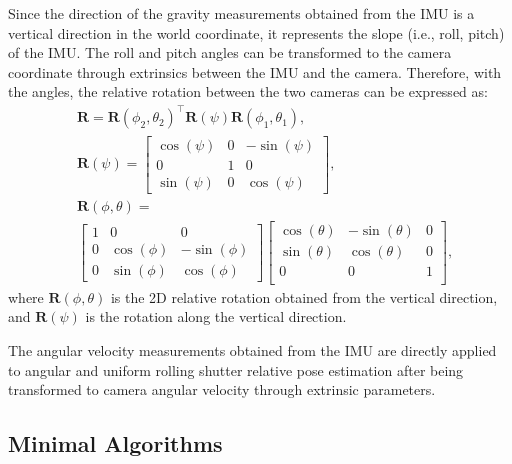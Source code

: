 \documentclass[10pt,twocolumn,letterpaper]{article}
\theoremstyle{definition}
\begin{document}
	Since the direction of the gravity measurements obtained from the IMU is a vertical direction in the world coordinate, it represents the slope (i.e., roll, pitch) of the IMU.
	The roll and pitch angles can be transformed to the camera coordinate through extrinsics between the IMU and the camera.
	Therefore, with the angles, the relative rotation between the two cameras can be expressed as:
	{
		\small
		\begin{equation}
		\begin{split}
		&\mathbf{R}  = 
		\mathbf{R}(\phi_2,\theta_2)^{\top} 
		\mathbf{R}(\psi)
		\mathbf{R}(\phi_1,\theta_1),
		\\
		& \mathbf{R}(\psi)
		=
		\begin{bmatrix}
		\cos\left(\psi\right) & 0 & -\sin\left(\psi\right) \\
		0 & 1 & 0 \\  
		\sin\left(\psi\right) & 0 & \cos\left(\psi\right)  
		\end{bmatrix},
		\\
		& \mathbf{R}(\phi,\theta) = \\
		&
		\begin{bmatrix}
		1 & 0 & 0 \\  
		0 & \cos\left(\phi\right) & -\sin\left(\phi\right) \\
		0 & \sin\left(\phi\right) & \cos\left(\phi\right)  
		\end{bmatrix}
		\begin{bmatrix}
		\cos\left(\theta\right) &  -\sin\left(\theta\right) & 0\\ 
		\sin\left(\theta\right) &  \cos\left(\theta\right)  & 0\\
		0 & 0 & 1 \\ 
		\end{bmatrix}
		,
		\end{split}
		\end{equation}
	}
	where $\mathbf{R}(\phi,\theta)$ is the 2D relative rotation obtained from the vertical direction, and $\mathbf{R}(\psi)$ is the rotation along the vertical direction.
	
	The angular velocity measurements obtained from the IMU are directly applied to angular and uniform rolling shutter relative pose estimation after being transformed to camera angular velocity through extrinsic parameters.
	
	
	
	\subsection{Minimal Algorithms} \label{subsec:minimal_points}
	
\end{document}
